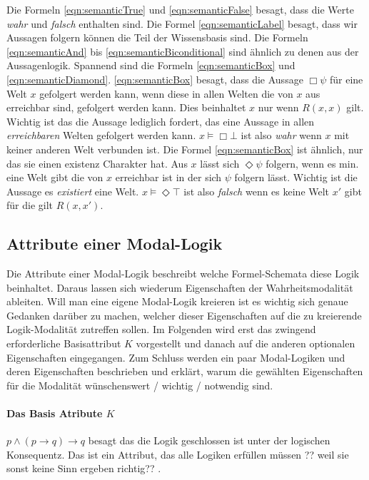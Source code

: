Die Formeln \eqref{eqn:semanticTrue} und \eqref{eqn:semanticFalse} besagt, dass die Werte \emph{wahr} und \emph{falsch} enthalten sind. 
Die Formel \eqref{eqn:semanticLabel} besagt, dass wir Aussagen folgern können die Teil der Wissensbasis sind.
Die Formeln \eqref{eqn:semanticAnd} bis \eqref{eqn:semanticBiconditional} sind ähnlich zu denen aus der Aussagenlogik.
Spannend sind die Formeln \eqref{eqn:semanticBox} und \eqref{eqn:semanticDiamond}. 
\eqref{eqn:semanticBox} besagt, dass die Aussage $\Box\psi$ für eine Welt $x$ gefolgert werden kann, wenn diese in allen Welten die von $x$ aus erreichbar sind, gefolgert werden kann. Dies beinhaltet $x$ nur wenn $R(x,x)$ gilt.
Wichtig ist das die Aussage lediglich fordert, das eine Aussage in allen \emph{erreichbaren} Welten gefolgert werden kann. $x \vDash \Box \bot$ ist also \emph{wahr} wenn $x$ mit keiner anderen Welt verbunden ist.
Die Formel \eqref{eqn:semanticBox} ist ähnlich, nur das sie einen existenz Charakter hat. Aus $x$ lässt sich $\Diamond \psi$ folgern, wenn es min. eine Welt gibt die von $x$ erreichbar ist in der sich $\psi$ folgern lässt. Wichtig ist die Aussage es \emph{existiert} eine Welt. $x \vDash \Diamond \top$ ist also \emph{falsch} wenn es keine Welt $x'$ gibt für die gilt $R(x,x')$.



\subsection{Attribute einer Modal-Logik} %
\label{sub:attribute_einer_modal_logik}
Die Attribute einer Modal-Logik beschreibt welche Formel-Schemata diese Logik beinhaltet. Daraus lassen sich wiederum Eigenschaften der Wahrheitsmodalität ableiten. Will man eine eigene Modal-Logik kreieren ist es wichtig sich genaue Gedanken darüber zu machen, welcher dieser Eigenschaften auf die zu kreierende Logik-Modalität zutreffen sollen.
Im Folgenden wird erst das zwingend erforderliche Basisattribut $K$ vorgestellt und danach auf die anderen optionalen Eigenschaften eingegangen. 
Zum Schluss werden ein paar Modal-Logiken und deren Eigenschaften beschrieben und erklärt, warum die gewählten Eigenschaften für die Modalität wünschenswert / wichtig / notwendig sind.

\paragraph{Das Basis Atribute $K$} %
\label{par:das_basis_atribute_k_} $p \wedge (p \rightarrow q) \rightarrow q$ besagt das die Logik geschlossen ist unter der logischen Konsequentz. Das ist ein Attribut, das alle Logiken erfüllen müssen ?? weil sie sonst keine Sinn ergeben richtig?? . 


